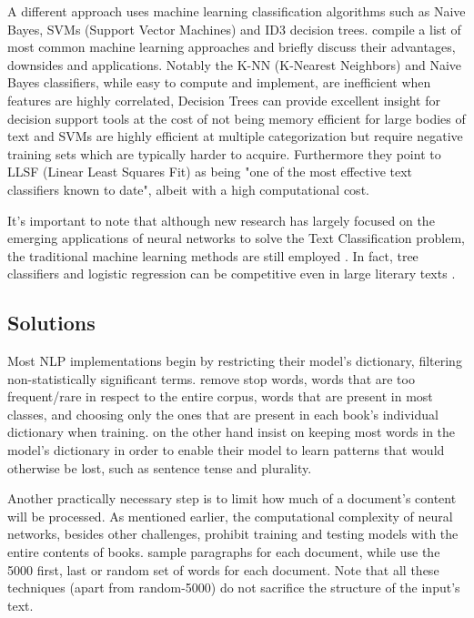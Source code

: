 \documentclass{article}
\begin{document}
	A different approach uses machine learning classification algorithms such as Naive Bayes, SVMs (Support Vector Machines) and ID3 decision trees. \textcite{korde} compile a list of most common machine learning approaches and briefly discuss their advantages, downsides and applications. Notably the K-NN (K-Nearest Neighbors) and Naive Bayes classifiers, while easy to compute and implement, are inefficient when features are highly correlated, Decision Trees can provide excellent insight for decision support tools at the cost of not being memory efficient for large bodies of text and SVMs are highly efficient at multiple categorization but require negative training sets which are typically harder to acquire. Furthermore they point to LLSF (Linear Least Squares Fit) as being "one of the most effective text classifiers known to date", albeit with a high computational cost.\par
	
	It's important to note that although new research has largely focused on the emerging applications of neural networks to solve the Text Classification problem, the traditional machine learning methods are still employed \cite{brazil} \cite{xu}. In fact, tree classifiers and logistic regression can be competitive even in large literary texts \cite{sicong}.
	
	
	\subsection{Solutions}

	Most NLP implementations begin by restricting their model's dictionary,  filtering non-statistically significant terms.\cite{sicong} remove stop words, words that are too frequent/rare in respect to the entire corpus, words that are present in most classes, and choosing only the ones that are present in each book's individual dictionary when training. \textcite{worsham} on the other hand insist on keeping most words in the model's dictionary in order to enable their model to learn patterns that would otherwise be lost, such as sentence tense and plurality.\par
	
	Another practically necessary step is to limit how much of a document's content will be processed. As mentioned earlier, the computational complexity of neural networks, besides other challenges, prohibit training and testing models with the entire contents of books. \textcite{sicong} sample paragraphs for each document, while \cite{worsham} use the 5000 first, last or random set of words for each document. Note that all these techniques (apart from random-5000) do not sacrifice the structure of the input's text.\par		
	
\end{document}
